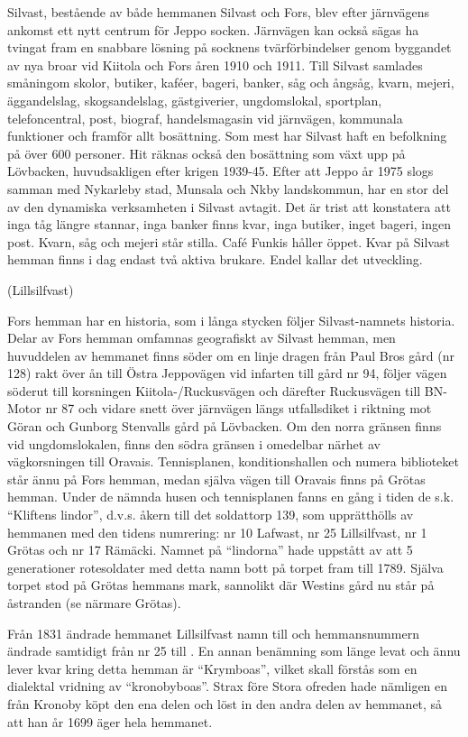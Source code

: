 Silvast, bestående av både hemmanen Silvast och Fors, blev efter järnvägens ankomst ett nytt centrum för Jeppo socken. Järnvägen kan också sägas ha tvingat fram en snabbare lösning på socknens tvärförbindelser genom byggandet av nya broar vid Kiitola och Fors åren 1910 och 1911. Till Silvast samlades småningom skolor, butiker, kaféer, bageri, banker, såg och ångsåg, kvarn, mejeri, äggandelslag, skogsandelslag, gästgiverier, ungdomslokal, sportplan, telefoncentral, post, biograf, handelsmagasin vid järnvägen, kommunala funktioner och framför allt bosättning. Som mest har Silvast haft en befolkning på över 600 personer. Hit räknas också den bosättning som växt upp på Lövbacken, huvudsakligen efter krigen 1939-45. Efter att Jeppo år 1975 slogs samman med Nykarleby stad, Munsala och Nkby landskommun, har en stor del av den dynamiska verksamheten i  Silvast avtagit. Det är trist att konstatera att inga tåg längre stannar, inga banker finns kvar, inga butiker, inget bageri, ingen post. Kvarn, såg och mejeri står stilla. Café Funkis håller öppet. Kvar på Silvast hemman finns i dag endast två aktiva brukare. Endel kallar det utveckling.


  (Lillsilfvast)

Fors hemman har en historia, som i långa stycken följer Silvast-namnets historia. Delar av Fors hemman omfamnas geografiskt av Silvast hemman, men huvuddelen av hemmanet finns söder om en linje dragen från Paul Bros gård (nr 128) rakt över ån till Östra Jeppovägen vid infarten till gård nr 94, följer vägen söderut till korsningen Kiitola-/Ruckusvägen och därefter Ruckusvägen till BN-Motor nr 87 och vidare snett över järnvägen längs utfallsdiket i riktning mot Göran och Gunborg Stenvalls gård på Lövbacken. Om den norra gränsen finns vid ungdomslokalen, finns den södra gränsen i omedelbar närhet av vägkorsningen till Oravais. Tennisplanen, konditionshallen och numera biblioteket står ännu på Fors hemman, medan själva vägen till Oravais finns på Grötas hemman. Under de nämnda husen och tennisplanen fanns en gång i tiden de s.k. ``Kliftens lindor'', d.v.s. åkern till det soldattorp 139, som upprätthölls av hemmanen med den tidens numrering: nr 10 Lafwast, nr 25 Lillsilfvast, nr 1 Grötas och nr 17 Rämäcki. Namnet på ``lindorna'' hade uppstått av att 5 generationer rotesoldater med detta namn bott på torpet fram till 1789. Själva torpet stod på Grötas hemmans mark, sannolikt där Westins gård nu står på åstranden (se närmare Grötas).

Från 1831 ändrade hemmanet Lillsilfvast namn till  och hemmansnummern ändrade samtidigt från nr 25  till . En annan benämning som länge levat och ännu lever kvar kring detta hemman är ``Krymboas'', vilket skall förstås som en dialektal vridning  av ``kronobyboas''. Strax före Stora ofreden hade nämligen en  från Kronoby köpt den ena delen och löst in den andra delen av hemmanet, så att han år 1699 äger hela hemmanet.

